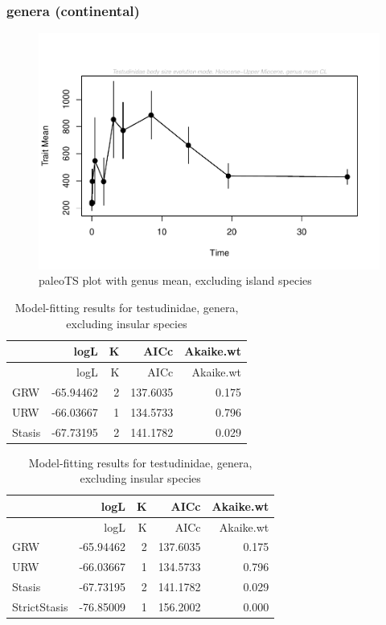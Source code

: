 \documentclass[]{article}
\begin{document}
\newpage

\subsubsection{genera (continental)}\label{genera-continental}

\begin{figure}[htbp]
\centering
\includegraphics{MA_JJ_files/figure-latex/paleoTS plot with genus mean, excluding island species-1.pdf}
\caption{paleoTS plot with genus mean, excluding island species}
\end{figure}

\begin{longtable}[]{@{}lrrrr@{}}
\caption{Model-fitting results for testudinidae, genera, excluding
insular species}\tabularnewline
\toprule
& logL & K & AICc & Akaike.wt\tabularnewline
\midrule
\endfirsthead
\toprule
& logL & K & AICc & Akaike.wt\tabularnewline
\midrule
\endhead
GRW & -65.94462 & 2 & 137.6035 & 0.175\tabularnewline
URW & -66.03667 & 1 & 134.5733 & 0.796\tabularnewline
Stasis & -67.73195 & 2 & 141.1782 & 0.029\tabularnewline
\bottomrule
\end{longtable}

\begin{longtable}[]{@{}lrrrr@{}}
\caption{Model-fitting results for testudinidae, genera, excluding
insular species}\tabularnewline
\toprule
& logL & K & AICc & Akaike.wt\tabularnewline
\midrule
\endfirsthead
\toprule
& logL & K & AICc & Akaike.wt\tabularnewline
\midrule
\endhead
GRW & -65.94462 & 2 & 137.6035 & 0.175\tabularnewline
URW & -66.03667 & 1 & 134.5733 & 0.796\tabularnewline
Stasis & -67.73195 & 2 & 141.1782 & 0.029\tabularnewline
StrictStasis & -76.85009 & 1 & 156.2002 & 0.000\tabularnewline
\bottomrule
\end{longtable}
\end{document}
